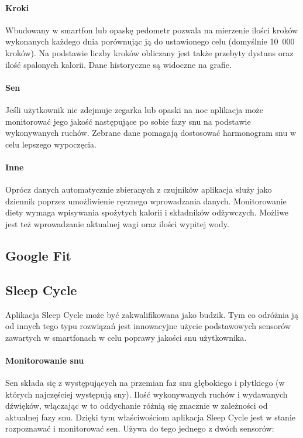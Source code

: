 \paragraph{Kroki} Wbudowany w smartfon lub opaskę pedometr pozwala na mierzenie ilości kroków wykonanych każdego dnia porównując ją do ustawionego celu (domyślnie 10~000 kroków). Na podstawie liczby kroków obliczany jest także przebyty dystans oraz ilość spalonych kalorii. Dane historyczne są widoczne na grafie.

\paragraph{Sen} Jeśli użytkownik nie zdejmuje zegarka lub opaski na noc aplikacja może monitorować jego jakość następujące po sobie fazy snu na podstawie wykonywanych ruchów. Zebrane dane pomagają dostosować harmonogram snu w celu lepszego wypoczęcia.

\paragraph{Inne} Oprócz danych automatycznie zbieranych z czujników aplikacja służy jako dziennik poprzez umożliwienie ręcznego wprowadzania danych. Monitorowanie diety wymaga wpisywania spożytych kalorii i składników odżywczych. Możliwe jest też wprowadzanie aktualnej wagi oraz ilości wypitej wody. 

\subsection{Google Fit}

\subsection{Sleep Cycle}
Aplikacja Sleep Cycle może być zakwalifikowana jako budzik. Tym co odróżnia ją od innych tego typu rozwiązań jest innowacyjne użycie podstawowych sensorów zawartych w smartfonach w celu poprawy jakości snu użytkownika. 

\paragraph{Monitorowanie snu}
Sen składa się z występujących na przemian faz snu głębokiego i płytkiego (w których najczęściej występują sny). Ilość wykonywanych ruchów i wydawanych dźwięków, włączając w to oddychanie różnią się znacznie w zależności od aktualnej fazy snu. Dzięki tym właściwościom aplikacja Sleep Cycle jest w stanie rozpoznawać i monitorować sen. Używa do tego jednego z dwóch sensorów:


